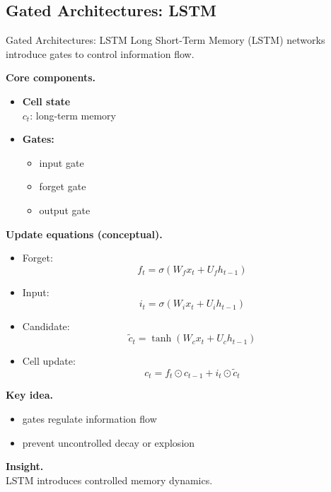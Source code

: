 \documentclass[aspectratio=169,11pt]{beamer}
\begin{document}
\subsection{Gated Architectures: LSTM}
\begin{frame}[t,allowframebreaks]{Gated Architectures: LSTM}
\small
Long Short-Term Memory (LSTM) networks introduce gates to control information flow.

\textbf{Core components.}\\ \begin{itemize}
    \item \textbf{Cell state}\\ $c_t$: long-term memory
    \item \textbf{Gates:}\\ \begin{itemize}
        \item input gate
        \item forget gate
        \item output gate
    \end{itemize}
\end{itemize}

\textbf{Update equations (conceptual).}\\ \begin{itemize}
    \item Forget:
    \[
    f_t = \sigma(W_f x_t + U_f h_{t-1})
    \]

    \item Input:
    \[
    i_t = \sigma(W_i x_t + U_i h_{t-1})
    \]

    \item Candidate:
    \[
    \tilde{c}_t = \tanh(W_c x_t + U_c h_{t-1})
    \]

    \item Cell update:
    \[
    c_t = f_t \odot c_{t-1} + i_t \odot \tilde{c}_t
    \]
\end{itemize}

\textbf{Key idea.}\\ \begin{itemize}
    \item gates regulate information flow
    \item prevent uncontrolled decay or explosion
\end{itemize}

\textbf{Insight.}\\ LSTM introduces controlled memory dynamics.
\end{frame}
\end{document}
